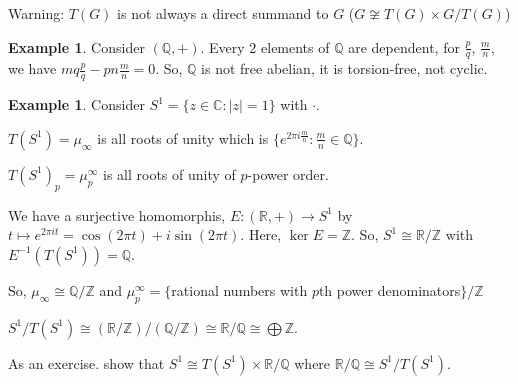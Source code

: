 \documentclass{amsart}
\theoremstyle{definition}
\newtheorem{example}[thm]{Example}
\newcommand{\R}{\mathbb R}
\newcommand{\Q}{\mathbb Q}
\newcommand{\Z}{\mathbb Z}
\newcommand{\C}{\mathbb C}
\begin{document}
Warning: $T(G)$ is not always a direct summand to $G$ ($G\not\cong T(G)\times G/T(G)$)
\begin{example}
Consider $(\Q,+)$. Every $2$ elements of $\Q$ are dependent, for $\frac{p}{q}$, $\frac{m}{n}$, we have $mq\frac{p}{q}-pn\frac{m}{n}=0$. So, $\Q$ is not free abelian, it is torsion-free, not cyclic.
\end{example}
\begin{example}
Consider $S^1=\{z\in\C:|z|=1\}$ with $\cdot$.

$T(S^1)=\mu_\infty$ is all roots of unity which is $\{e^{2\pi i\frac{m}{n}}: \frac{m}{n}\in\Q\}$.

$T(S^1)_p=\mu_p^\infty$ is all roots of unity of $p$-power order.

We have a surjective homomorphis, $E:(\R,+)\to S^1$ by $t\mapsto e^{2\pi i t}=\cos(2\pi t)+i\sin(2\pi t)$. Here, $\ker E=\Z$. So, $S^1\cong \R/\Z$ with $E^{-1}(T(S^1))=\Q$.

So, $\mu_\infty\cong \Q/\Z$ and $\mu_p^\infty=\{$rational numbers with $p$th power denominators$\}/\Z$

$S^1/T(S^1)\cong (\R/\Z)/(\Q/\Z)\cong \R/\Q\cong \bigoplus \Z$.	
\end{example}

As an exercise. show that $S^1\cong T(S^1)\times \R/\Q$ where $\R/\Q\cong S^1/T(S^1)$.
\end{document}
